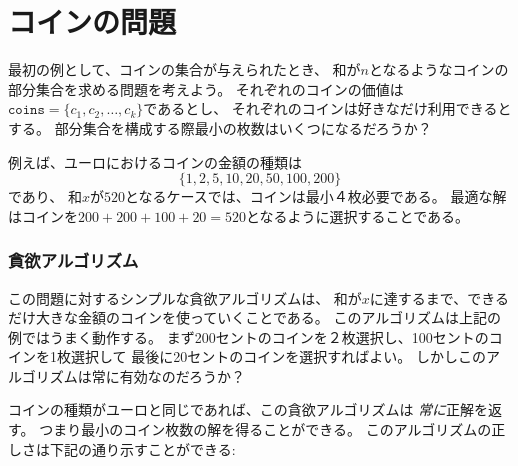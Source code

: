 \section{コインの問題}

最初の例として、コインの集合が与えられたとき、
和が$n$となるようなコインの部分集合を求める問題を考えよう。
それぞれのコインの価値は$\texttt{coins}=\{c_1,c_2,\ldots,c_k\}$であるとし、
それぞれのコインは好きなだけ利用できるとする。
部分集合を構成する際最小の枚数はいくつになるだろうか？

例えば、ユーロにおけるコインの金額の種類は\[\{1,2,5,10,20,50,100,200\}\]であり、
和$x$が$520$となるケースでは、コインは最小４枚必要である。
最適な解はコインを$200+200+100+20 = 520$となるように選択することである。

\begin{comment}
\subsubsection{Greedy algorithm}

A simple greedy algorithm to the problem
always selects the largest possible coin,
until the required sum of money has been constructed.
This algorithm works in the example case,
because we first select two 200 cent coins,
then one 100 cent coin and finally one 20 cent coin.
But does this algorithm always work?

It turns out that if the coins are the euro coins,
the greedy algorithm \emph{always} works, i.e.,
it always produces a solution with the fewest
possible number of coins.
The correctness of the algorithm can be
shown as follows:
\end{comment}

\subsubsection{貪欲アルゴリズム}

この問題に対するシンプルな貪欲アルゴリズムは、
和が$x$に達するまで、できるだけ大きな金額のコインを使っていくことである。
このアルゴリズムは上記の例ではうまく動作する。
まず200セントのコインを２枚選択し、100セントのコインを1枚選択して
最後に20セントのコインを選択すればよい。
しかしこのアルゴリズムは常に有効なのだろうか？

コインの種類がユーロと同じであれば、この貪欲アルゴリズムは
\emph{常に}正解を返す。
つまり最小のコイン枚数の解を得ることができる。
このアルゴリズムの正しさは下記の通り示すことができる:

\begin{comment}
First, each coin 1, 5, 10, 50 and 100 appears
at most once in an optimal solution,
because if the
solution would contain two such coins,
we could replace them by one coin and
obtain a better solution.
For example, if the solution would contain
coins $5+5$, we could replace them by coin $10$.

In the same way, coins 2 and 20 appear
at most twice in an optimal solution,
because we could replace
coins $2+2+2$ by coins $5+1$ and
coins $20+20+20$ by coins $50+10$.
Moreover, an optimal solution cannot contain
coins $2+2+1$ or $20+20+10$,
because we could replace them by coins $5$ and $50$.
\end{comment}


